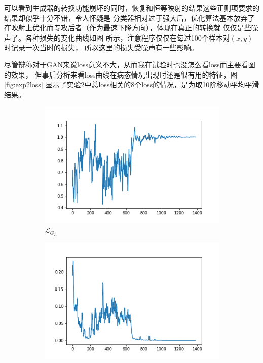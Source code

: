 \documentclass[twocolumn,11pt]{ctexart}
\begin{document}
可以看到生成器的转换功能崩坏的同时，恢复和恒等映射的结果这些正则项要求的结果却似乎十分不错，令人怀疑是
分类器相对过于强大后，优化算法基本放弃了在映射上优化而专攻后者（作为最速下降方向），体现在真正的转换就
仅仅是些噪声了。各种损失的变化曲线如图 所示，注意程序仅仅在每过100个样本对$(x,y)$时记录一次当时的损失，
所以这里的损失受噪声有一些影响。

尽管\cite{zhu2017unpaired}辩称对于GAN来说loss意义不大，从而我在试验时也没怎么看loss而主要看图的效果，
但事后分析来看loss曲线在病态情况出现时还是很有用的特征，图 \ref{fig:exp2loss}
显示了实验2中总loss相关的8个loss的情况，是为取10阶移动平均平滑结果。

\begin{figure}[htb]
    \centering
    \begin{subfigure}[b]{0.23\linewidth}
        \includegraphics[width=\linewidth]{exp2_G_A.png}
        \caption{$\mathcal{L}_{G_A}$}
      \end{subfigure}
      \begin{subfigure}[b]{0.23\linewidth}
        \includegraphics[width=\linewidth]{exp2_D_A.png}

\end{subfigure}
\end{figure}
\end{document}
